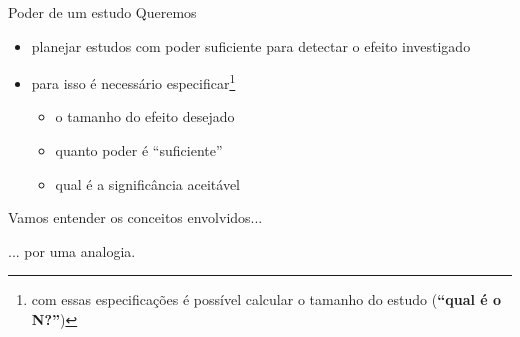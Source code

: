 \documentclass{beamer}
\begin{document}
\begin{frame}{\scriptsize Poder de um estudo}
  \footnotesize
  Queremos
  \bigskip
  \begin{itemize}
    \footnotesize
  \item planejar estudos com poder suficiente para detectar o efeito investigado
    \medskip
  \item para isso é necessário especificar\footnote{\tiny com essas especificações é possível calcular o tamanho do estudo ({\bf ``qual é o N?''})}
    \begin{itemize}
      \scriptsize
    \item o tamanho do efeito desejado
    \item quanto poder é ``suficiente''
    \item qual é a significância aceitável
    \end{itemize}
  \end{itemize}
\end{frame}

\begin{frame}
  \begin{center}
    Vamos entender os conceitos envolvidos...

    \bigskip
    ... por uma analogia.
  \end{center}
\end{frame}
\end{document}
